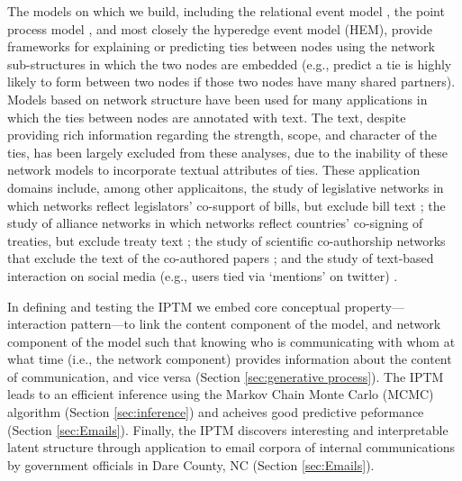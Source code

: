 \documentclass[ba]{imsart}
\numberwithin{equation}{section}
\theoremstyle{plain}
\begin{document}
The models on which we build, including the relational event model \citep{Butts2008}, the point process model \citep{PerryWolfe2012}, and most closely the hyperedge event model (HEM), provide frameworks for explaining or predicting ties between nodes using the network sub-structures in which the two nodes are embedded (e.g., predict a tie is highly likely to form between two nodes if those two nodes have many shared partners). Models based on network structure have been used for many applications in which the ties between nodes are annotated with text. The text, despite providing rich information regarding the strength, scope, and character of the ties, has been largely excluded from these analyses, due to the inability of these network models to incorporate textual attributes of ties. These application domains include, among other applicaitons, the study of legislative networks in which networks reflect legislators' co-support of bills, but exclude bill text \citep{bratton2011networks,aleman2013explaining}; the study of alliance networks in which networks reflect countries' co-signing of treaties, but exclude treaty text \citep{camber2010geometry,cranmer2012complex,cranmer2012toward,kinne2016agreeing}; the study of scientific co-authorship networks that exclude the text of the co-authored papers \citep{kronegger2011collaboration,liang2015changing,fahmy2016gender}; and the study of text-based interaction on social media (e.g., users tied via `mentions' on twitter) \citep{yoon2014strategies,peng2016follower,lai2017connecting}.~

In defining and testing the IPTM we embed core conceptual property---interaction pattern---to link the content component of the model, and network component of the model such that knowing who is communicating with whom at what time (i.e., the network component) provides information about the content of communication, and vice versa (Section \ref{sec:generative process}). The IPTM leads to an efficient inference using the Markov Chain Monte Carlo (MCMC) algorithm (Section \ref{sec:inference}) and acheives good predictive peformance (Section \ref{sec:Emails}). Finally, the IPTM discovers interesting and interpretable latent structure through application to email corpora of internal communications by government officials in Dare County, NC (Section \ref{sec:Emails}). 
~
	
\end{document}
